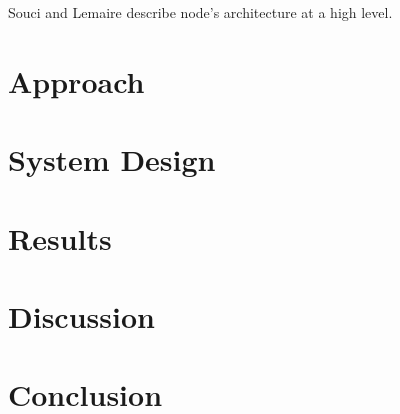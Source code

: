 \documentclass{acm_proc_article-sp}
\begin{document}
Souci and Lemaire\cite{souci:2014} describe node's architecture at a
high level.

\section{Approach}

\section{System Design}

\section{Results}

\section{Discussion}

\section{Conclusion}




\balancecolumns
\end{document}
